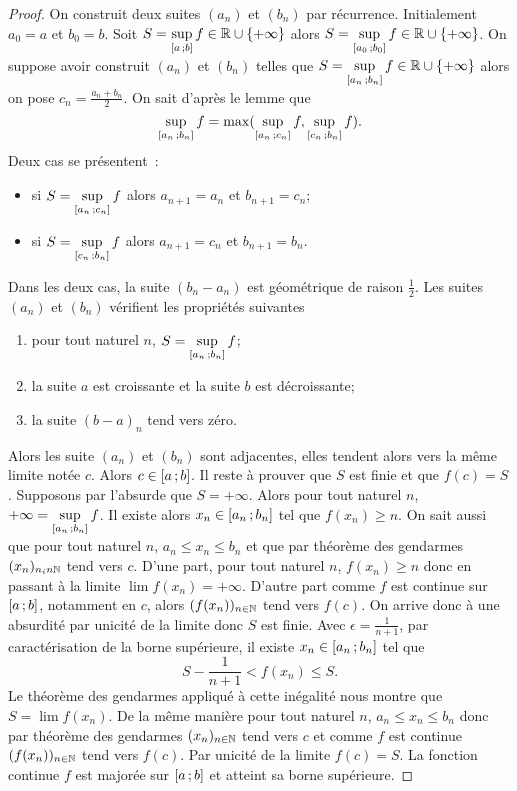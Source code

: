\begin{proof}
  On construit deux suites $(a_n)$ et $(b_n)$ par récurrence. Initialement $a_0=a$ et $b_0=b$. Soit $S=\sup\limits_{\left[ a \, ;  b \right]}f \in \mathbb{R}\cup\{+\infty\}$ alors $S=\sup\limits_{\left[ a_0 \, ;  b_0 \right]}f \in \mathbb{R}\cup\{+\infty\}$. On suppose avoir construit $(a_n)$ et $(b_n)$ telles que $S=\sup\limits_{\left[ a_n \, ;  b_n \right]}f \in \mathbb{R}\cup\{+\infty\}$ alors on pose $c_n=\frac{a_n+b_n}{2}$. On sait d'après le lemme que 
  \begin{equation}
    \sup\limits_{\left[ a_n \, ;  b_n \right]}f=\max(\sup\limits_{\left[ a_n \, ;  c_n \right]}f,\sup\limits_{\left[ c_n \, ;  b_n \right]}f).
  \end{equation}
  Deux cas se présentent~:
  \begin{itemize}
  \item si $S=\sup\limits_{\left[ a_n \, ;  c_n \right]}f$ alors $a_{n+1}=a_n$ et $b_{n+1}=c_n$;
  \item si $S=\sup\limits_{\left[ c_n \, ;  b_n \right]}f$ alors $a_{n+1}=c_n$ et $b_{n+1}=b_n$.
  \end{itemize}
  Dans les deux cas, la suite $(b_n-a_n)$ est géométrique de raison $\frac{1}{2}$. Les suites $(a_n)$ et $(b_n)$ vérifient les propriétés suivantes
  \begin{enumerate}
  \item pour tout naturel $n$, $S=\sup\limits_{\left[ a_n \, ;  b_n \right]}f$;
  \item la suite $a$ est croissante et la suite $b$ est décroissante;
  \item la suite $(b-a)_n$ tend vers zéro.
  \end{enumerate}
  Alors les suite $(a_n)$ et $(b_n)$ sont adjacentes, elles tendent alors vers la même limite notée $c$. Alors $c \in \left[ a \, ;  b \right]$. Il reste à prouver que $S$ est finie et que $f(c)=S$. Supposons par l'absurde que $S=+\infty$. Alors pour tout naturel $n$, $+\infty = \sup\limits_{\left[ a_n \, ;  b_n \right]}f$. Il existe alors $x_n \in \left[ a_n \, ;  b_n \right]$ tel que $f(x_n) \geqslant n$. On sait aussi que pour tout naturel $n$, $a_n \leqslant x_n \leqslant b_n$ et que par théorème des gendarmes $(x_n)_{n _in \mathbb{N}}$ tend vers $c$. D'une part, pour tout naturel $n$, $f(x_n) \geqslant n$ donc en passant à la limite $\lim f(x_n) = +\infty$. D'autre part comme $f$ est continue sur $\left[ a \, ;  b \right]$, notamment en $c$, alors $(f(x_n))_{n\in \mathbb{N}}$ tend vers $f(c)$. On arrive donc à une absurdité par unicité de la limite donc $S$ est finie. Avec $\epsilon=\frac{1}{n+1}$, par caractérisation de la borne supérieure, il existe $x_n \in \left[ a_n \, ;  b_n \right]$ tel que
  \begin{equation}
    S-\frac{1}{n+1} < f(x_n) \leqslant S.
  \end{equation}
  Le théorème des gendarmes appliqué à cette inégalité nous montre que $S=\lim f(x_n)$. De la même manière pour tout naturel $n$, $a_n \leqslant x_n \leqslant b_n$ donc par théorème des gendarmes $(x_n)_{n\in \mathbb{N}}$ tend vers $c$ et comme $f$ est continue $(f(x_n))_{n\in \mathbb{N}}$ tend vers $f(c)$. Par unicité de la limite $f(c)=S$. La fonction continue $f$ est majorée sur $\left[ a \, ;  b \right]$ et atteint sa borne supérieure.
\end{proof}

